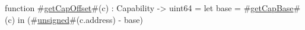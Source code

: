 function #\hyperref[sailMIPSzgetCapOffset]{getCapOffset}#(c) : Capability -> uint64 =
    let base = #\hyperref[sailMIPSzgetCapBase]{getCapBase}#(c) in
    (#\hyperref[sailMIPSzunsigned]{unsigned}#(c.address) - base) %
